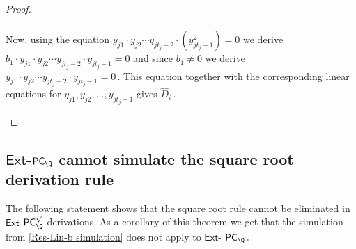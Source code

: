 \documentclass{toc}
\begin{document}
\begin{proof}
\begin{itemize}
\begin{multline*}
    \end{multline*}
    Now, using the equation  $y_{j 1} \cdot y_{j 2} \cdots y_{j t_j - 2} \cdot (y_{j t_j - 1}^2) = 0$ we derive $ b_1 \cdot y_{j 1} \cdot y_{j 2} \cdots y_{j t_j - 2} \cdot y_{j t_j - 1} = 0$ and since $b_1 \neq 0$ we derive %
$y_{j 1} \cdot y_{j 2} \cdots y_{j t_j - 2} \cdot y_{j t_j - 1} = 0\,.$ %
 This equation together with the corresponding linear equations for  $y_{j 1}, y_{j 2}, \ldots, y_{j t_j - 1}$ gives %
$\widehat{D}_i\,.$ %
   \qedhere %
\end{itemize}
\end{proof}     %


\subsection{\texorpdfstring{$\mathsf{Ext}$-$\mathsf{PC}_{\Q}$}{Ext-PC-Q}
 cannot simulate the square root derivation rule}

%
The following statement shows that the square root rule cannot be eliminated in $\mathsf{Ext}$-$\mathsf{PC}_{\Q}^\surd$ derivations. As a corollary of this theorem we get that the simulation from \autoref{Res-Lin-b simulation} does not apply to $\mathsf{Ext}$-%
$\mathsf{PC}_{\Q}\,.$ %
%
\end{document}
